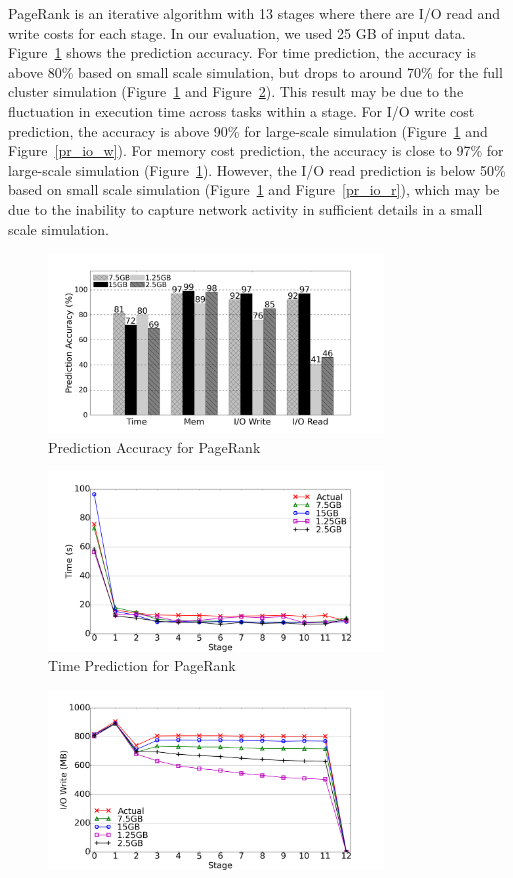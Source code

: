 {\noindent
PageRank is an iterative algorithm with 13 stages where there are I/O read and write costs for each stage. In our evaluation, we used 25 GB of input data. Figure~\ref{pr_accuracy} shows the prediction accuracy. For time prediction, the accuracy is above 80\% based on small scale simulation, but drops to around 70\% for the full cluster simulation (Figure~\ref{pr_accuracy} and Figure~\ref{pr_time}). This result may be due to the fluctuation in execution time across tasks within a stage. 
For I/O write cost prediction, the accuracy is above 90\% for large-scale simulation (Figure~\ref{pr_accuracy} and Figure~\ref{pr_io_w}). For memory cost prediction, the accuracy is close to 97\% for large-scale simulation (Figure~\ref{pr_accuracy}). However, the I/O read prediction is below 50\% based on small scale simulation (Figure~\ref{pr_accuracy} and Figure~\ref{pr_io_r}), which may be due to the inability to capture network activity in sufficient details in a small scale simulation.
\begin{figure}[!t]
\centering
\includegraphics[width=3.5in]{figures/pr_accuracy.png}
\caption{Prediction Accuracy for PageRank}
\label{pr_accuracy}
\end{figure}
\begin{figure}[!t]
\centering
\includegraphics[width=3.5in]{figures/pr_time.png}
\caption{Time Prediction for PageRank}
\label{pr_time}
\end{figure}
\begin{figure}[!t]
\centering
\includegraphics[width=3.5in]{figures/pr_io_w.png}

\end{figure}}
